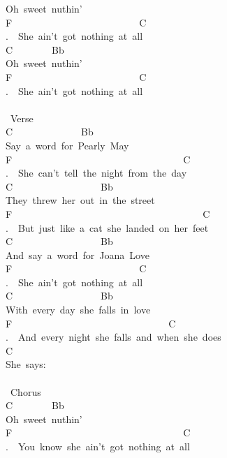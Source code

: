 {Oh\ sweet\ nuthin'\\
F\ \ \ \ \ \ \ \ \ \ \ \ \ \ \ \ \ \ \ \ \ \ \ \ \ \ C\\
.\ \ She\ ain't\ got\ nothing\ at\ all\\
C\ \ \ \ \ \ \ \ Bb\\
Oh\ sweet\ nuthin'\\
F\ \ \ \ \ \ \ \ \ \ \ \ \ \ \ \ \ \ \ \ \ \ \ \ \ \ C\\
.\ \ She\ ain't\ got\ nothing\ at\ all\\
\\
\lbrack\ Verse\rbrack\\
C\ \ \ \ \ \ \ \ \ \ \ \ \ \ Bb\\
Say\ a\ word\ for\ Pearly\ May\\
F\ \ \ \ \ \ \ \ \ \ \ \ \ \ \ \ \ \ \ \ \ \ \ \ \ \ \ \ \ \ \ \ \ \ \ C\\
.\ \ She\ can't\ tell\ the\ night\ from\ the\ day\\
C\ \ \ \ \ \ \ \ \ \ \ \ \ \ \ \ \ \ Bb\\
They\ threw\ her\ out\ in\ the\ street\\
F\ \ \ \ \ \ \ \ \ \ \ \ \ \ \ \ \ \ \ \ \ \ \ \ \ \ \ \ \ \ \ \ \ \ \ \ \ \ \ C\\
.\ \ But\ just\ like\ a\ cat\ she\ landed\ on\ her\ feet\\
C\ \ \ \ \ \ \ \ \ \ \ \ \ \ \ \ \ \ Bb\\
And\ say\ a\ word\ for\ Joana\ Love\\
F\ \ \ \ \ \ \ \ \ \ \ \ \ \ \ \ \ \ \ \ \ \ \ \ \ \ C\\
.\ \ She\ ain't\ got\ nothing\ at\ all\\
C\ \ \ \ \ \ \ \ \ \ \ \ \ \ \ \ \ \ Bb\\
With\ every\ day\ she\ falls\ in\ love\\
F\ \ \ \ \ \ \ \ \ \ \ \ \ \ \ \ \ \ \ \ \ \ \ \ \ \ \ \ \ \ \ \ C\\
.\ \ And\ every\ night\ she\ falls\ and\ when\ she\ does\\
C\\
She\ says:\\
\\
\lbrack\ Chorus\rbrack\\
C\ \ \ \ \ \ \ \ Bb\\
Oh\ sweet\ nuthin'\\
F\ \ \ \ \ \ \ \ \ \ \ \ \ \ \ \ \ \ \ \ \ \ \ \ \ \ \ \ \ \ \ \ \ \ \ C\\
.\ \ You\ know\ she\ ain't\ got\ nothing\ at\ all\\
}

